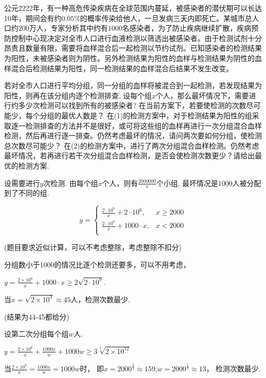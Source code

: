 \documentclass[cs4size,windows,a4paper,answers]{BHCexam}
\begin{document}
\begin{groups}
\begin{questions}[s]
\begin{solution}
\end{solution}
\question[16] 公元2222年，有一种高危传染疾病在全球范围内蔓延，被感染者的潜伏期可以长达10年，期间会有约$0.05\%$的概率传染给他人，一旦发病三天内即死亡。某城市总人口约200万人，专家分析其中约有$1000$名感染者，为了防止疾病继续扩散，疾病预防控制中心现决定对全市人口进行血液检测以筛选出被感染者。由于检测试剂十分昂贵且数量有限，需要将血样混合后一起检测以节约试剂。已知感染者的检测结果为阳性，未被感染者则为阴性。另外检测结果为阳性的血样与检测结果为阴性的血样混合后检测结果为阳性，同一检测结果的血样混合后结果不发生改变。
\begin{subquestions}
    \subquestion 若对全市人口进行平均分组，同一分组的血样将被混合到一起检测，若发现结果为阳性，则再在该分组内逐个检测排查. 设每个组$x$个人，那么最坏情况下，需要进行约多少次检测可以找到所有的被感染者? 在当前方案下，若要使检测的次数尽可能少，每个分组的最优人数是？
    \subquestion 在(1)的检测方案中，对于检测结果为阳性的组采取逐一检测排查的方法并不是很好，或可将这些组的血样再进行一次分组混合血样检测，然后再进行逐一排查。仍然考虑最坏的情况，请问两次要如何分组，使检测总次数尽可能少？
    \subquestion 在(2)的检测方案中，进行了两次分组混合血样检测。仍然考虑最坏情况，若再进行若干次分组混合血样检测，是否会使检测次数更少？请给出最优的检测方案.
\end{subquestions}
\begin{solution}
\methodonly
设需要进行$y$次检测. 由每个组$x$个人，则有$\frac{2000000}{x}$个小组, 最坏情况是1000人被分配到了不同的组. 

\[
y=\begin{cases}
\frac{2\cdot 10^6}{x}+2\cdot 10^6, & x \ge 2000 \\
\frac{2\cdot 10^6}{x}+1000\cdot x, & x \lt 2000 \\
\end{cases}
\]

(题目要求近似计算，可以不考虑整除，考虑整除不扣分)


分组数小于1000的情况比逐个检测还要多，可以不用考虑，

$y=\frac{2\times 10^6}{x}+1000\cdot x \ge 2\sqrt{2\cdot 10^9}$.

当$x=\sqrt{2\times10^3}\approx45$人，检测次数最少.

(结果为44-45都给分)

设第二次分组每个组$w$人.

$y=\frac{2\times10^6}{x}+\frac{1000x}{w}+1000w \ge 3\sqrt[3]{2\times10^{12}}$

当$\frac{2\times10^6}{x}=\frac{1000x}{w}=1000w$时，
即$x=2000^\frac{2}{3}\approx159$,$w=2000^\frac{1}{3}\approx13$，
检测次数最少.


\end{solution}
\end{questions}
\end{groups}
\end{document}
